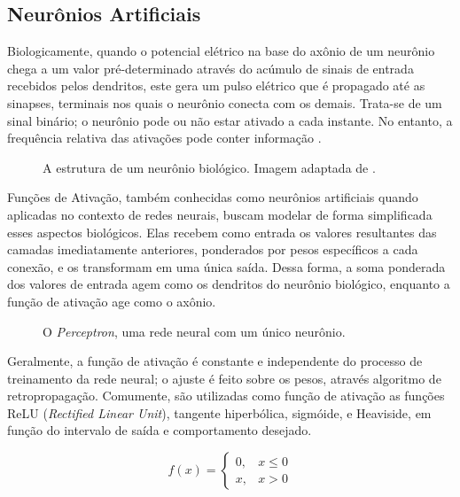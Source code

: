 \subsection{Neurônios Artificiais}

Biologicamente, quando o potencial elétrico na base do axônio de um neurônio chega a um valor pré-determinado através do acúmulo de sinais de entrada recebidos pelos dendritos, este gera um pulso elétrico que é propagado até as sinapses, terminais nos quais o neurônio conecta com os demais.
Trata-se de um sinal binário; o neurônio pode ou não estar ativado a cada instante. No entanto, a frequência relativa das ativações pode conter informação \cite{behnkeHierarchicalNeuralNetworks2003}.

\begin{figure}[H]
    \centering
    
    \caption{A estrutura de um neurônio biológico. Imagem adaptada de \cite{dhp1080IdoSkemoPri2016}.}
    \label{fig:bio_neuron}
\end{figure}

Funções de Ativação, também conhecidas como neurônios artificiais quando aplicadas no contexto de redes neurais, buscam modelar de forma simplificada esses aspectos biológicos.
Elas recebem como entrada os valores resultantes das camadas imediatamente anteriores, ponderados por pesos específicos a cada conexão, e os transformam em uma única saída.
Dessa forma, a soma ponderada dos valores de entrada agem como os dendritos do neurônio biológico, enquanto a função de ativação age como o axônio.

\begin{figure}[H]
    \centering
    
    \caption{O \textit{Perceptron}, uma rede neural com um único neurônio.}
    \label{fig:perceptron}
\end{figure}

Geralmente, a função de ativação é constante e independente do processo de treinamento da rede neural; o ajuste é feito sobre os pesos, através algoritmo de retropropagação.
Comumente, são utilizadas como função de ativação as funções ReLU (\textit{Rectified Linear Unit}), tangente hiperbólica, sigmóide, e Heaviside, em função do intervalo de saída e comportamento desejado.

\begin{equation}\label{eq:relu}
    f(x) = \left\{
        \begin{array}{ll}
            0, & x \le 0\\
            x, & x > 0
        \end{array}
    \right.
\end{equation}

